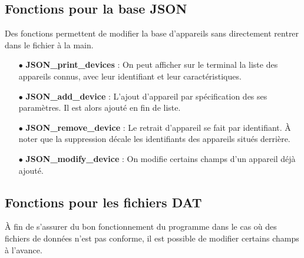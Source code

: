 \documentclass[12pt]{article}
\begin{document}
\subsection{Fonctions pour la base JSON}

    Des fonctions permettent de modifier la base d'appareils sans directement rentrer dans le fichier à la main.
    
    \begin{enumerate}
        \item[$\bullet$] \textbf{JSON\_print\_devices} : On peut afficher sur le terminal la liste des appareils connus, avec leur identifiant et leur caractéristiques.
        \item[$\bullet$] \textbf{JSON\_add\_device} : L'ajout d'appareil par spécification des ses paramètres. Il est alors ajouté en fin de liste.
        \item[$\bullet$] \textbf{JSON\_remove\_device} : Le retrait d'appareil se fait par identifiant. À noter que la suppression décale les identifiants des appareils situés derrière.
        \item[$\bullet$] \textbf{JSON\_modify\_device} : On modifie certains champs d'un appareil déjà ajouté.
    \end{enumerate}

\subsection{Fonctions pour les fichiers DAT}

    À fin de s'assurer du bon fonctionnement du programme dans le cas où des fichiers de données n'est pas conforme, il est possible de modifier certains champs à l'avance.
\end{document}
